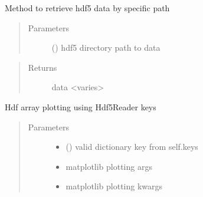 \documentclass[letterpaper,10pt,english]{sphinxmanual}
\begin{document}
\begin{fulllineitems}

\begin{fulllineitems}
\label{\detokenize{index:lb_colloids.Colloids.Colloid_output.ModelPlot.get_data_by_path}}
Method to retrieve hdf5 data by specific path
\begin{quote}\begin{description}
\item[{Parameters}] \leavevmode
{} () \textendash{} hdf5 directory path to data

\end{description}\end{quote}
\begin{quote}\begin{description}
\item[{Returns}] \leavevmode
data \textless{}varies\textgreater{}

\end{description}\end{quote}

\end{fulllineitems}


\begin{fulllineitems}
\label{\detokenize{index:lb_colloids.Colloids.Colloid_output.ModelPlot.plot}}
Hdf array plotting using Hdf5Reader keys
\begin{quote}\begin{description}
\item[{Parameters}] \leavevmode\begin{itemize}
\item {} 
 () \textendash{} valid dictionary key from self.keys

\item {} 
 \textendash{} 
matplotlib plotting args


\item {} 
 \textendash{} 
matplotlib plotting kwargs


\end{itemize}


\end{description}
\end{quote}
\end{fulllineitems}
\end{fulllineitems}
\end{document}
